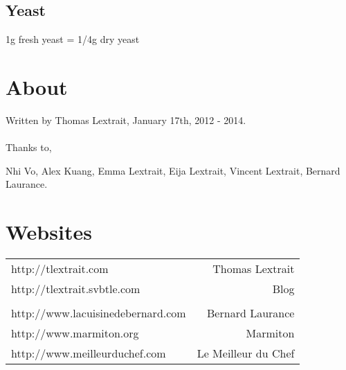 \documentclass[10pt]{book}
\begin{document}
\subsection*{Yeast}
1g fresh yeast = 1/4g dry yeast

\newpage
\section*{About}

Written by Thomas Lextrait, January 17th, 2012 - 2014.\\\\
Thanks to,

Nhi Vo, Alex Kuang, Emma Lextrait, Eija Lextrait, Vincent Lextrait, Bernard Laurance.

\newpage
\section*{Websites}

\begin{tabular}{ l r }
http://tlextrait.com & Thomas Lextrait \\
http://tlextrait.svbtle.com & Blog\\\\
http://www.lacuisinedebernard.com & Bernard Laurance \\
http://www.marmiton.org & Marmiton\\
http://www.meilleurduchef.com & Le Meilleur du Chef\\
\end{tabular}

\newpage
\end{document}
